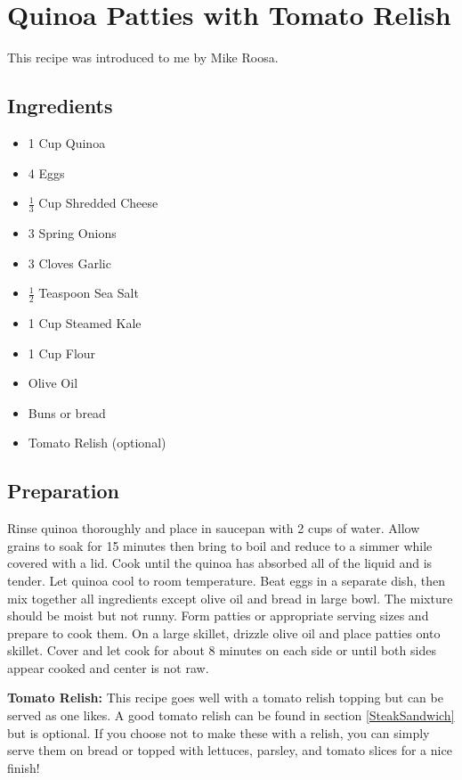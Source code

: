 \thispagestyle{fancy}
\section{Quinoa Patties with Tomato Relish}
\AddToShipoutPicture*{\QuinoaPatties}

This recipe was introduced to me by Mike Roosa.

\subsection*{Ingredients}
\begin{multicols}{3}
	\begin{itemize}
		\item 1 Cup Quinoa
		\item 4 Eggs
		\item $\frac{1}{3}$ Cup Shredded Cheese
		\item 3 Spring Onions
		\item 3 Cloves Garlic
		\item $\frac{1}{2}$ Teaspoon Sea Salt
		\item 1 Cup Steamed Kale
		\item 1 Cup Flour
		\item Olive Oil
		\item Buns or bread
		\item Tomato Relish (optional)
	\end{itemize}
\end{multicols}


\subsection*{Preparation}

Rinse quinoa thoroughly and place in saucepan with 2 cups of water. Allow grains to soak for 15 minutes then bring to boil and reduce to a simmer while covered with a lid. Cook until the quinoa has absorbed all of the liquid and is tender. Let quinoa cool to room temperature. Beat eggs in a separate dish, then mix together all ingredients except olive oil and bread in large bowl. The mixture should be moist but not runny. Form patties or appropriate serving sizes and prepare to cook them. On a large skillet, drizzle olive oil and place patties onto skillet. Cover and let cook for about 8 minutes on each side or until both sides appear cooked and center is not raw.

\textbf{Tomato Relish: } This recipe goes well with a tomato relish topping but can be served as one likes. A good tomato relish can be found in section \ref{SteakSandwich} but is optional. If you choose not to make these with a relish, you can simply serve them on bread or topped with lettuces, parsley, and tomato slices for a nice finish!

